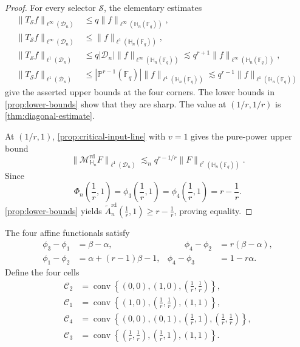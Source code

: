 \documentclass[11pt,letterpaper]{amsart}
\numberwithin{equation}{section}
\theoremstyle{definition}
\theoremstyle{remark}
\newcommand{\Fq}{\mathbb F_q}
\newcommand{\PP}{\mathbb P}
\newcommand{\HH}{\mathbb H}
\newcommand{\Dn}{\mathcal D_n}
\newcommand{\Mrd}{\mathcal M^{\mathrm{rd}}_{\HH_n}}
\newcommand{\norm}[1]{\lVert #1\rVert}
\newcommand{\conv}{\operatorname{conv}}
\begin{document}
\begin{proof}
For every selector $\mathcal S$, the elementary estimates
\begin{align}
 \norm{T_{\mathcal S}f}_{\ell^\infty(\Dn)}
 &\leq q\norm{f}_{\ell^\infty(\HH_n(\Fq))},
 \label{eq:value-infty-infty}\\
 \norm{T_{\mathcal S}f}_{\ell^\infty(\Dn)}
 &\leq\norm{f}_{\ell^1(\HH_n(\Fq))},
 \label{eq:value-one-infty}\\
 \norm{T_{\mathcal S}f}_{\ell^1(\Dn)}
 &\leq q|\Dn|\norm{f}_{\ell^\infty(\HH_n(\Fq))}
 \lesssim q^{r+1}\norm{f}_{\ell^\infty(\HH_n(\Fq))},
 \label{eq:value-infty-one}\\
 \norm{T_{\mathcal S}f}_{\ell^1(\Dn)}
 &\leq |\PP^{r-1}(\Fq)|\norm{f}_{\ell^1(\HH_n(\Fq))}
 \lesssim q^{r-1}\norm{f}_{\ell^1(\HH_n(\Fq))}
 \label{eq:value-one-one}
\end{align}
give the asserted upper bounds at the four corners. The lower bounds in \cref{prop:lower-bounds} show that they are sharp. The value at $(1/r,1/r)$ is \cref{thm:diagonal-estimate}.

At $(1/r,1)$, \cref{prop:critical-input-line} with $v=1$
gives the pure-power upper bound
\[
 \norm{\Mrd F}_{\ell^1(\Dn)}
 \lesssim_n
 q^{r-1/r}\norm{F}_{\ell^r(\HH_n(\Fq))}.
\]
Since
\[
 \Phi_n\left(\frac1r,1\right)
 =\phi_3\left(\frac1r,1\right)
 =\phi_4\left(\frac1r,1\right)
 =r-\frac1r.
\]
\cref{prop:lower-bounds} yields
$\widetilde A_n^{\mathrm{rd}}\left(\frac1r,1\right)\geq r-\frac1r$, proving equality.
\end{proof}

The four affine functionals satisfy
\begin{equation}\label{eq:dominance-identities}
\begin{aligned}
 \phi_3-\phi_1&=\beta-\alpha,
 &\qquad
 \phi_4-\phi_2&=r(\beta-\alpha),\\
 \phi_1-\phi_2&=\alpha+(r-1)\beta-1,
 &
 \phi_4-\phi_3&=1-r\alpha.
\end{aligned}
\end{equation}
Define the four cells
\begin{equation}\label{eq:four-cells}
\begin{aligned}
 \mathcal C_2
 &=\conv\left\{(0,0),(1,0),\left(\frac1r,\frac1r\right)\right\},\\
 \mathcal C_1
 &=\conv\left\{(1,0),\left(\frac1r,\frac1r\right),(1,1)\right\},\\
 \mathcal C_4
 &=\conv\left\{(0,0),(0,1),\left(\frac1r,1\right),
                    \left(\frac1r,\frac1r\right)\right\},\\
 \mathcal C_3
 &=\conv\left\{\left(\frac1r,\frac1r\right),
                    \left(\frac1r,1\right),(1,1)\right\}.
\end{aligned}
\end{equation}
\end{document}
